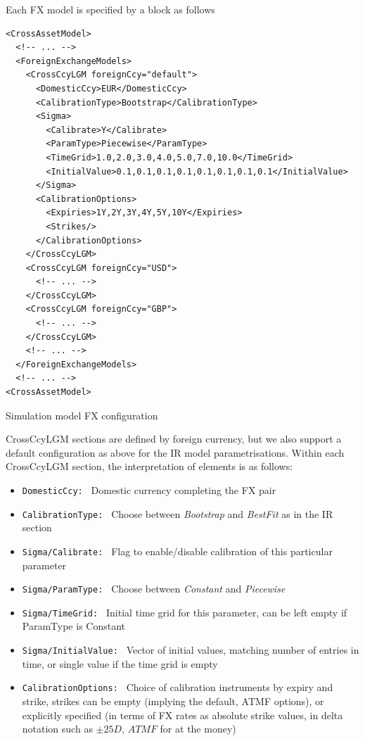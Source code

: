 \documentclass[12pt, a4paper]{article}
\begin{document}
\medskip

Each FX model is specified by a block as follows

\begin{listing}[H]
\begin{verbatim}
<CrossAssetModel>	
  <!-- ... -->
  <ForeignExchangeModels>
    <CrossCcyLGM foreignCcy="default">
      <DomesticCcy>EUR</DomesticCcy>
      <CalibrationType>Bootstrap</CalibrationType>
      <Sigma>
        <Calibrate>Y</Calibrate>
        <ParamType>Piecewise</ParamType>
        <TimeGrid>1.0,2.0,3.0,4.0,5.0,7.0,10.0</TimeGrid>
        <InitialValue>0.1,0.1,0.1,0.1,0.1,0.1,0.1,0.1</InitialValue>
      </Sigma>
      <CalibrationOptions>
        <Expiries>1Y,2Y,3Y,4Y,5Y,10Y</Expiries>
        <Strikes/>
      </CalibrationOptions>
    </CrossCcyLGM>
    <CrossCcyLGM foreignCcy="USD">
      <!-- ... -->
    </CrossCcyLGM>
    <CrossCcyLGM foreignCcy="GBP">
      <!-- ... -->
    </CrossCcyLGM>
    <!-- ... -->
  </ForeignExchangeModels>
  <!-- ... -->
<CrossAssetModel>	
\end{verbatim}
\caption{Simulation model FX configuration}
\label{lst:simulation_model_fx_configuration}
\end{listing}

CrossCcyLGM sections are defined by foreign currency, but we also support a default configuration as above for the IR
model parametrisations.  Within each CrossCcyLGM section, the interpretation of elements is as follows:

\begin{itemize}
\item {\tt DomesticCcy: } Domestic currency completing the FX pair
\item {\tt CalibrationType: } Choose between {\em Bootstrap} and {\em BestFit} as in the IR section
\item {\tt Sigma/Calibrate: } Flag to enable/disable calibration of this particular parameter
\item {\tt Sigma/ParamType: } Choose between {\em Constant} and {\em Piecewise}
\item {\tt Sigma/TimeGrid: } Initial time grid for this parameter, can be left empty if ParamType is Constant
\item {\tt Sigma/InitialValue: } Vector of initial values, matching number of entries in time, or single value if the
time grid is empty
\item {\tt CalibrationOptions: } Choice of calibration instruments by expiry and strike, strikes can be empty (implying
the default, ATMF options), or explicitly specified (in terms of FX rates as absolute strike values, in delta notation
such as $\pm 25D$, $ATMF$ for at the money)
\end{itemize}
\end{document}

